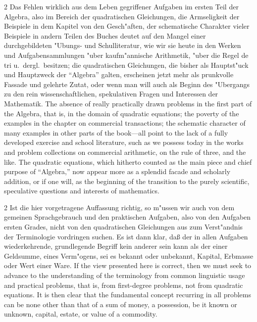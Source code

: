 \documentclass[10pt,a4paper]{article}
\renewcommand{\switchcolumn}{\syncronize\nointerlineskip\columnbreak}
\newcommand{\enquote}[1]{``#1''}
\begin{document}
\begin{paracol}{2}
Das Fehlen wirklich aus dem Leben gegriffener Aufgaben im ersten Teil der Algebra, also im Bereich der quadratischen Gleichungen, die Armseligkeit der Beispiele in dem Kapitel von den Gesch"aften, der schematische Charakter vieler Beispiele in andern Teilen des Buches deutet auf den Mangel einer durchgebildeten "Ubungs- und Schulliteratur, wie wir sie heute in den Werken und Aufgabensammlungen "uber kaufm"annische Arithmetik, "uber die Regel de tri u.\ dergl.\ besitzen; die quadratischen Gleichungen, die bisher als Hauptst"uck und Hauptzweck der \enquote{Algebra} galten, erscheinen jetzt mehr als prunkvolle Fassade und gelehrte Zutat, oder wenn man will auch als Beginn des "Ubergangs zu den rein wissenschaftlichen, spekulativen Fragen und Interessen der Mathematik.
\switchcolumn
The absence of really practically drawn problems in the first part of the Algebra, that is, in the domain of quadratic equations; the poverty of the examples in the chapter on commercial transactions; the schematic character of many examples in other parts of the book---all point to the lack of a fully developed exercise and school literature, such as we possess today in the works and problem collections on commercial arithmetic, on the rule of three, and the like. The quadratic equations, which hitherto counted as the main piece and chief purpose of ``Algebra,'' now appear more as a splendid facade and scholarly addition, or if one will, as the beginning of the transition to the purely scientific, speculative questions and interests of mathematics.
\end{paracol}

\begin{paracol}{2}
Ist die hier vorgetragene Auffassung richtig, so m"ussen wir auch von dem gemeinen Sprachgebrauch und den praktischen Aufgaben, also von den Aufgaben ersten Grades, nicht von den quadratischen Gleichungen aus zum Verst"andnis der Terminologie vordringen suchen. Es ist dann klar, da\ss{} der in allen Aufgaben wiederkehrende, grundlegende Begriff kein anderer sein kann als der einer Geldsumme, eines Verm"ogens, sei es bekannt oder unbekannt, Kapital, Erbmasse oder Wert einer Ware.
\switchcolumn
If the view presented here is correct, then we must seek to advance to the understanding of the terminology from common linguistic usage and practical problems, that is, from first-degree problems, not from quadratic equations. It is then clear that the fundamental concept recurring in all problems can be none other than that of a sum of money, a possession, be it known or unknown, capital, estate, or value of a commodity.
\end{paracol}
\end{document}
